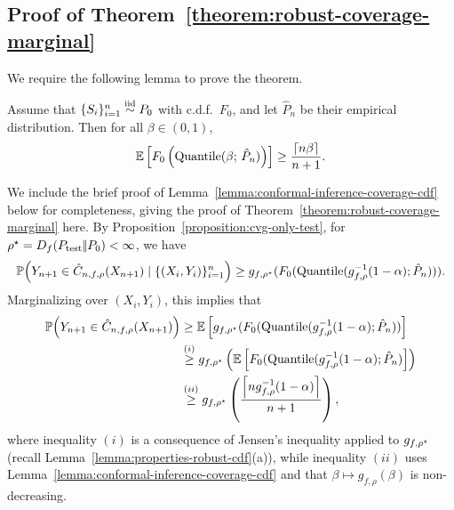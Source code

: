 \subsection{Proof of Theorem~\ref{theorem:robust-coverage-marginal}}
\label{sec:proof-robust-coverage-marginal}

We require the following lemma to prove the theorem.
\begin{lemma}
  \label{lemma:conformal-inference-coverage-cdf}
  Assume that $\{ S_i \}_{i=1}^n \stackrel{\rm iid}{\sim} P_0$ with c.d.f.\ $F_0$, and
  let $\hat P_n$ be their empirical distribution.  Then for all $\beta \in
  (0,1)$,
  \begin{align*}
    \mathbb{E} \left[ F_0\left( \textup{Quantile}(\beta; \, \hat P_n) \right) \right] \ge \frac{\left\lceil{n\beta}\right\rceil}{n+1}.
  \end{align*}
\end{lemma}

We include the brief proof of
Lemma~\ref{lemma:conformal-inference-coverage-cdf} below for completeness,
giving the proof of Theorem~\ref{theorem:robust-coverage-marginal} here.
By Proposition~\ref{proposition:cvg-only-test}, for
$\rho^\star = D_{f}({P_{\textup{test}}} |\!| {P_0}) < \infty$,
we have
\begin{align*}
  \mathbb{P} \Big( Y_{n+1} \in \hat C_{n,f, \rho}(X_{n+1}) \mid  \{(X_i,Y_i)\}_{i=1}^n \Big)  
  \ge g_{f,\rho^\star}(F_0(\textup{Quantile}(g_{f,\rho}^{-1}(1-\alpha); \hat P_n))).
\end{align*}
Marginalizing over $(X_i, Y_i)$,
this implies that
\begin{align*}
  \mathbb{P} \Big( Y_{n+1} \in \hat C_{n,f, \rho}(X_{n+1}) \Big)  
  & \ge \mathbb{E} \left[ g_{f,\rho^\star}(F_0(\textup{Quantile}(g_{f,\rho}^{-1}(1-\alpha); \hat P_n))
    \right] \\
  & \stackrel{(i)}{\ge}  g_{f,\rho^\star}\left(
  \mathbb{E}\left[ F_0(\textup{Quantile}(g_{f,\rho}^{-1}(1-\alpha); \hat P_n) \right] \right) \\
  & \stackrel{(ii)}{\ge}
  g_{f,\rho^\star} \left(\frac{\left\lceil{n g_{f,\rho}^{-1}(1-\alpha)}\right\rceil}{n+1}\right),
\end{align*}
where inequality $(i)$ is a consequence of Jensen's inequality applied to
$g_{f,\rho^\star}$ (recall Lemma~\ref{lemma:properties-robust-cdf}(a)),
while inequality $(ii)$ uses
Lemma~\ref{lemma:conformal-inference-coverage-cdf} and that $\beta
\mapsto g_{f,\rho}(\beta)$ is non-decreasing.

